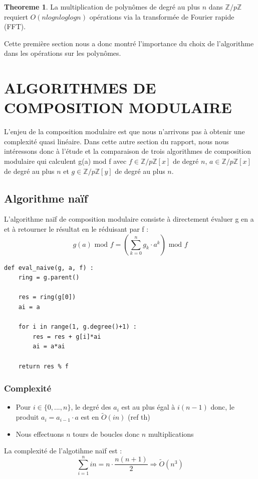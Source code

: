 \documentclass[a4paper]{article}
\begin{document}
\theoremstyle{definition}
\newtheorem*{thm}{Theoreme}
\begin{thm}
La multiplication de polynômes de degré au plus $n$ dans $\mathbb{Z}/p\mathbb{Z}$ requiert $O(nlognloglogn)$ opérations via la transformée de Fourier rapide (FFT).
\cite{aecf-2017-livre}
\end{thm}

Cette première section nous a donc montré l'importance du choix de l'algorithme dans les opérations sur les polynômes.


\section{ALGORITHMES DE COMPOSITION MODULAIRE}

L'enjeu de la composition modulaire est que nous n'arrivons pas à obtenir une complexité quasi linéaire.
Dans cette autre section du rapport, nous nous intéressons donc à l'étude et la comparaison de trois algorithmes de composition modulaire qui calculent g(a) mod f avec 
$f \in \mathbb{Z}/p\mathbb{Z}[x]$ de degré $n$, $a \in \mathbb{Z}/p\mathbb{Z}[x]$ de degré au plus $n$ et $g \in \mathbb{Z}/p\mathbb{Z}[y]$ de degré au plus $n$.



\subsection{Algorithme naïf}

L'algorithme naïf de composition modulaire consiste à directement évaluer g en a et à retourner le résultat en le réduisant par f :
\[
g(a)\text{ mod }f = \left(\sum_{k=0}^n g_k \cdot a^k\right) \text{ mod }f    
\]

\begin{lstlisting}[title={naive}]
def eval_naive(g, a, f) :
	ring = g.parent()

	res = ring(g[0])
	ai = a
	
    for i in range(1, g.degree()+1) :
		res = res + g[i]*ai
		ai = a*ai

	return res % f
\end{lstlisting}

\subsubsection*{Complexité}
\begin{itemize}
    \item Pour $i \in \{0,...,n\}$, le degré des $a_i$ est au plus égal à $i(n-1)$ donc, le produit $a_i=a_{i-1}\cdot a$ est en $\tilde{O}(in)$ (ref th)
    \item Nous effectuons $n$ tours de boucles donc $n$ multiplications
\end{itemize}
La complexité de l'algotihme naïf est :
\[
\sum_{i=1}^{n}in=n \cdot \dfrac{n(n+1)}{2} \Longrightarrow \tilde{O}(n^3)
\]
\end{document}
